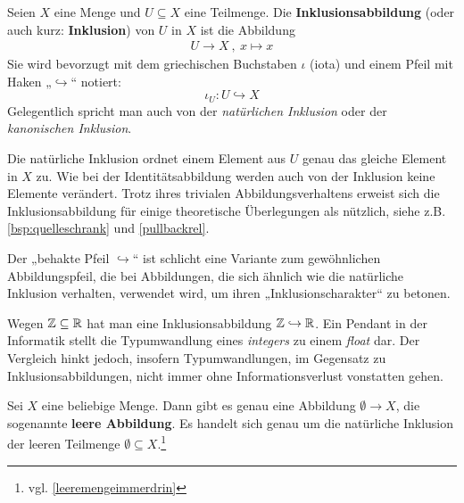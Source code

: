 \begin{defin}[Inklusionsabbildung] \label{def:inklusion} 
    Seien $X$ eine Menge und $U\subseteq X$ eine Teilmenge. Die \textbf{Inklusionsabbildung} (oder auch kurz: \textbf{Inklusion}) von $U$ in $X$ ist die Abbildung
    \begin{align*}
        U \to X \ ,\ x \mapsto x
    \end{align*}
    Sie wird bevorzugt mit dem griechischen Buchstaben $\iota$ (iota) und einem Pfeil mit Haken „$\hookrightarrow$“ notiert:
        \[ \iota_U : U \hookrightarrow X \]
    Gelegentlich spricht man auch von der \emph{natürlichen Inklusion} oder der \emph{kanonischen Inklusion}.
\end{defin}


\begin{bem}
    Die natürliche Inklusion ordnet einem Element aus $U$ genau das gleiche Element in $X$ zu. Wie bei der Identitätsabbildung werden auch von der Inklusion keine Elemente verändert. Trotz ihres trivialen Abbildungsverhaltens erweist sich die Inklusionsabbildung für einige theoretische Überlegungen als nützlich, siehe z.B. \cref{bsp:quelleschrank} und \cref{pullbackrel}.
    
    Der „behakte Pfeil $\hookrightarrow$“ ist schlicht eine Variante zum gewöhnlichen Abbildungspfeil, die bei Abbildungen, die sich ähnlich wie die natürliche Inklusion verhalten, verwendet wird, um ihren „Inklusionscharakter“ zu betonen.
\end{bem}


\begin{bsp}
    Wegen $\mathbb Z\subseteq\mathbb R$ hat man eine Inklusionsabbildung $\mathbb Z \hookrightarrow \mathbb R$. Ein Pendant in der Informatik stellt die Typumwandlung eines \emph{integers} zu einem \emph{float} dar. Der Vergleich hinkt jedoch, insofern Typumwandlungen, im Gegensatz zu Inklusionsabbildungen, nicht immer ohne Informationsverlust vonstatten gehen.
\end{bsp}


\begin{defin} 
    Sei $X$ eine beliebige Menge. Dann gibt es genau eine Abbildung $\emptyset\to X$, die sogenannte \textbf{leere Abbildung}. Es handelt sich genau um die natürliche Inklusion der leeren Teilmenge $\emptyset\subseteq X$.\footnote{vgl. \cref{leeremengeimmerdrin}}
\end{defin}





